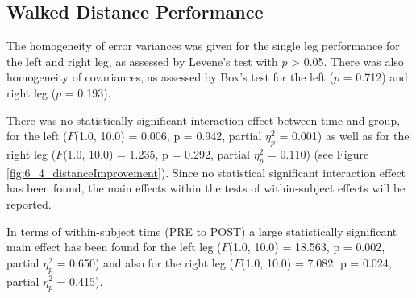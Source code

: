 \subsection{Walked Distance Performance}
The homogeneity of error variances was given for the single leg performance for the left and right leg, as assessed by Levene's test with $p$ > 0.05.
There was also homogeneity of covariances, as assessed by Box's test for the left ($p$ = 0.712) and right leg ($p$ = 0.193).

There was no statistically significant interaction effect between time and group, for the left ($F$(1.0, 10.0) = 0.006, p = 0.942, partial $\eta_{p}^{2}$ = 0.001) as well as for the right leg ($F$(1.0, 10.0) = 1.235, p = 0.292, partial $\eta_{p}^{2}$ = 0.110) (see Figure \ref{fig:6_4_distanceImprovement}).
Since no statistical significant interaction effect has been found, the main effects within the tests of within-subject effects will be reported.

In terms of within-subject time (PRE to POST) a large statistically significant main effect has been found for the left leg ($F$(1.0, 10.0) = 18.563, p = 0.002, partial $\eta_{p}^{2}$ = 0.650) and also for the right leg ($F$(1.0, 10.0) = 7.082, p = 0.024, partial $\eta_{p}^{2}$ = 0.415).

